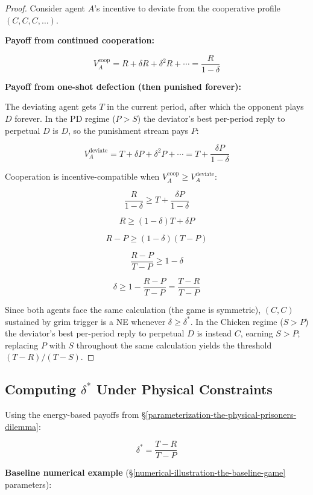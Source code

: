 \documentclass[11pt]{article}
\theoremstyle{plain}
\theoremstyle{definition}
\theoremstyle{remark}
\let\origsubsection\subsection
\renewcommand{\subsection}{\needspace{7\baselineskip}\origsubsection}
\begin{document}
\begin{proof}
Consider agent $A$'s incentive to deviate from the cooperative profile $(C, C, C, \ldots)$.

\textbf{Payoff from continued cooperation:}

$$V_A^{\text{coop}} = R + \delta R + \delta^2 R + \cdots = \frac{R}{1 - \delta}$$

\textbf{Payoff from one-shot defection (then punished forever):}

The deviating agent gets $T$ in the current period, after which the opponent plays $D$ forever. In the PD regime ($P > S$) the deviator's best per-period reply to perpetual $D$ is $D$, so the punishment stream pays $P$:

$$V_A^{\text{deviate}} = T + \delta P + \delta^2 P + \cdots = T + \frac{\delta P}{1 - \delta}$$

Cooperation is incentive-compatible when $V_A^{\text{coop}} \geq V_A^{\text{deviate}}$:

$$\frac{R}{1 - \delta} \geq T + \frac{\delta P}{1 - \delta}$$

$$R \geq (1 - \delta) T + \delta P$$

$$R - P \geq (1 - \delta)(T - P)$$

$$\frac{R - P}{T - P} \geq 1 - \delta$$

$$\delta \geq 1 - \frac{R - P}{T - P} = \frac{T - R}{T - P}$$

Since both agents face the same calculation (the game is symmetric), $(C, C)$ sustained by grim trigger is a NE whenever $\delta \geq \delta^*$. In the Chicken regime ($S > P$) the deviator's best per-period reply to perpetual $D$ is instead $C$, earning $S > P$; replacing $P$ with $S$ throughout the same calculation yields the threshold $(T - R)/(T - S)$.
\end{proof}

\subsection{\texorpdfstring{Computing \(\delta^*\) Under Physical
Constraints}{Computing \textbackslash delta\^{}* Under Physical Constraints}}\label{computing-delta-star}

Using the energy-based payoffs from
§\ref{parameterization-the-physical-prisoners-dilemma}:

\[\delta^* = \frac{T - R}{T - P}\]

\textbf{Baseline numerical example}
(§\ref{numerical-illustration-the-baseline-game} parameters):
\end{document}
